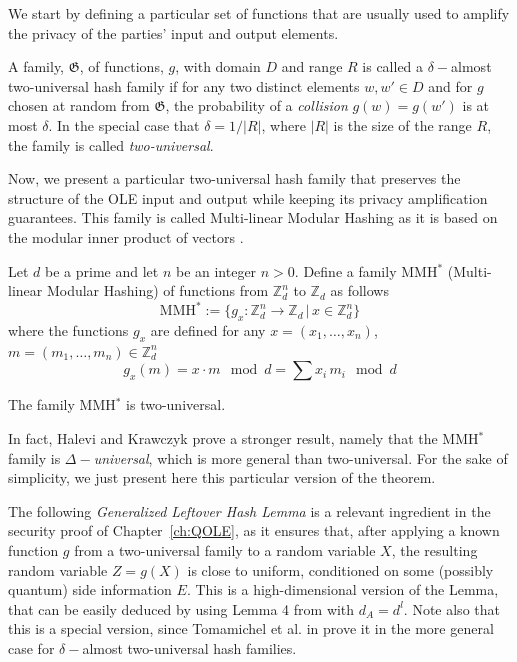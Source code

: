We start by defining a particular set of functions that are usually used to amplify the privacy of the parties' input and output elements. 

\begin{definition}
A family, $\mathfrak{G}$, of functions, $g$, with domain $D$ and range $R$ is called a $\delta-$almost two-universal hash family if for any two distinct elements $w,w'\in D$ and for $g$ chosen at random from $\mathfrak{G}$, the probability of a \textit{collision} $g(w)=g(w')$ is at most $\delta$. In the special case that $\delta=1/|R|$, where $|R|$ is the size of the range $R$, the family is called \textit{two-universal}. 
\end{definition}

Now, we present a particular two-universal hash family that preserves the structure of the OLE input and output while keeping its privacy amplification guarantees. This family is called Multi-linear Modular Hashing as it is based on the modular inner product of vectors \cite{HK97}.
\begin{definition}
Let $d$ be a prime and let $n$ be an integer $n>0$. Define a family MMH$^*$ (Multi-linear Modular Hashing) of functions from $\mathbb{Z}_d^n$ to $\mathbb{Z}_d$ as follows
$$\text{MMH}^*:= \{ g_x : \mathbb{Z}_d^n\rightarrow \mathbb{Z}_d \, | \, x\in \mathbb{Z}_d^n \}$$
where the functions $g_x$ are defined for any $x = (x_1,\ldots,x_n)$, $m = (m_1,\ldots, m_n) \in \mathbb{Z}_d^n$
$$g_x(m) = x\cdot m \mod d = \sum x_i\, m_i \mod d$$
\label{def:MMH}
\end{definition}



\begin{theorem}
The family MMH$^*$ is two-universal.
\end{theorem}
In fact, Halevi and Krawczyk \cite{HK97} prove a stronger result, namely that the MMH$^*$ family is \textit{$\Delta-$universal}, which is more general than two-universal. For the sake of simplicity, we just present here this particular version of the theorem.

The following \textit{Generalized Leftover Hash Lemma} is a relevant ingredient in the security proof of Chapter~\ref{ch:QOLE}, as it ensures that, after applying a known function $g$  from a two-universal family to a random variable $X$, the resulting random variable $Z = g(X)$  is close to uniform, conditioned on some (possibly quantum) side information $E$. This is a high-dimensional version of the Lemma, that can be easily deduced by using Lemma 4 from \cite{TSSR11} with $d_A = d^l$. Note also that this is a special version, since Tomamichel et al. in \cite{TSSR11} prove it in the more general case for $\delta-$almost two-universal hash families.

